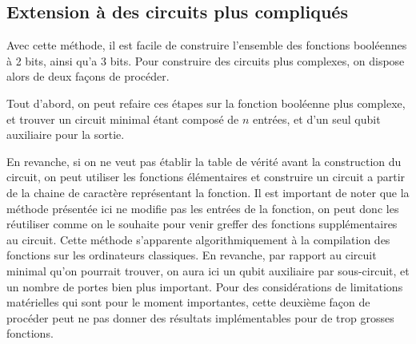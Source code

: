 \subsection*{Extension à des circuits plus compliqués}
Avec cette méthode, il est facile de construire l'ensemble des fonctions booléennes à 2 bits, ainsi qu'a 3 bits. Pour construire des circuits plus complexes, on dispose alors de deux façons de procéder.

Tout d'abord, on peut refaire ces étapes sur la fonction booléenne plus complexe, et trouver un circuit minimal étant composé de $n$ entrées, et d'un seul qubit auxiliaire pour la sortie.

En revanche, si on ne veut pas établir la table de vérité avant la construction du circuit, on peut utiliser les fonctions élémentaires et construire un circuit a partir de la chaine de caractère représentant la fonction. Il est important de noter que la méthode présentée ici ne modifie pas les entrées de la fonction, on peut donc les réutiliser comme on le souhaite pour venir greffer des fonctions supplémentaires au circuit. Cette méthode s'apparente algorithmiquement à la compilation des fonctions sur les ordinateurs classiques. En revanche, par rapport au circuit minimal qu'on pourrait trouver, on aura ici un qubit auxiliaire par sous-circuit, et un nombre de portes bien plus important. Pour des considérations de limitations matérielles qui sont pour le moment importantes, cette deuxième façon de procéder peut ne pas donner des résultats implémentables pour de trop grosses fonctions.